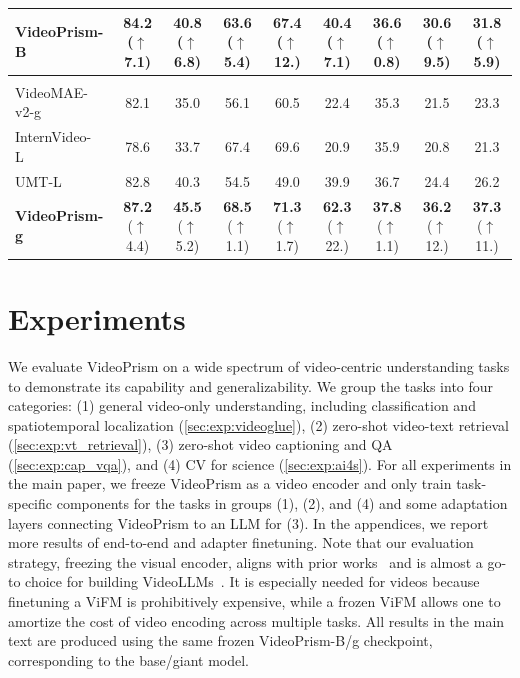 \documentclass{article}
\theoremstyle{plain}
\theoremstyle{definition}
\theoremstyle{remark}
\newcommand{\OURS}{VideoPrism\xspace}
\newcommand{\upcolor}[1]{\textcolor{vpblue}{($\uparrow$#1)}}
\newcommand{\tabbar}[2]{\rowcolor{gray!15} \multicolumn{#1}{l}{\textit{#2}}}
\begin{document}
\begin{table}[t]
\begin{center}
\begin{scriptsize}
\begin{tabular}{@{}l|cc|cc|c|c|cc@{}}
\textbf{\OURS-B} & \textbf{84.2} \upcolor{7.1} & \textbf{40.8} \upcolor{6.8} & \textbf{63.6} \upcolor{5.4} & \textbf{67.4} \upcolor{12.} & \textbf{40.4} \upcolor{7.1} & \textbf{36.6} \upcolor{0.8} & \textbf{30.6} \upcolor{9.5} & \textbf{31.8} \upcolor{5.9} \\
\midrule
\tabbar{9}{Large-scale models} \\
VideoMAE-v2-g~\cite{wang2023videomae} & 82.1 & 35.0 & 56.1 & 60.5 & 22.4 & 35.3 & 21.5 & 23.3 \\
InternVideo-L~\cite{wang2022internvideo} & 78.6 & 33.7 & 67.4 & 69.6 & 20.9 & 35.9 & 20.8 & 21.3 \\
UMT-L~\cite{li2023unmasked} & 82.8 & 40.3 & 54.5 & 49.0 & 39.9 & 36.7 & 24.4 & 26.2 \\
\textbf{\OURS-g} & \textbf{87.2} \upcolor{4.4} & \textbf{45.5} \upcolor{5.2} & \textbf{68.5} \upcolor{1.1} & \textbf{71.3} \upcolor{1.7} & \textbf{62.3} \upcolor{22.} & \textbf{37.8} \upcolor{1.1} & \textbf{36.2} \upcolor{12.} & \textbf{37.3} \upcolor{11.} \\
\bottomrule
\end{tabular}
\end{scriptsize}
\end{center}
\vskip -0.1in
\end{table}

\section{Experiments}\label{sec:exp}
We evaluate \OURS on a wide spectrum of video-centric understanding tasks to demonstrate its capability and generalizability. We group the tasks into four categories: (1) general video-only understanding, including classification and spatiotemporal localization (\cref{sec:exp:videoglue}), (2) zero-shot video-text retrieval (\cref{sec:exp:vt_retrieval}), (3) zero-shot video captioning and QA (\cref{sec:exp:cap_vqa}), and (4) CV for science (\cref{sec:exp:ai4s}). For all experiments in the main paper, we freeze \OURS as a video encoder and only train task-specific components for the tasks in groups (1), (2), and (4) and some adaptation layers connecting \OURS to an LLM for (3). In the appendices, we report more results of end-to-end and adapter finetuning. Note that our evaluation strategy, freezing the visual encoder, aligns with prior works~\cite{he2022masked,singh2022flava,yuan2023videoglue} and is almost a go-to choice for building VideoLLMs~\cite{tang2023video}. It is especially needed for videos because finetuning a ViFM is  prohibitively expensive, while a frozen ViFM allows one to amortize the cost of video encoding across multiple tasks. All results in the main text are produced using the same frozen VideoPrism-B/g checkpoint, corresponding to the base/giant model. 
\end{document}
